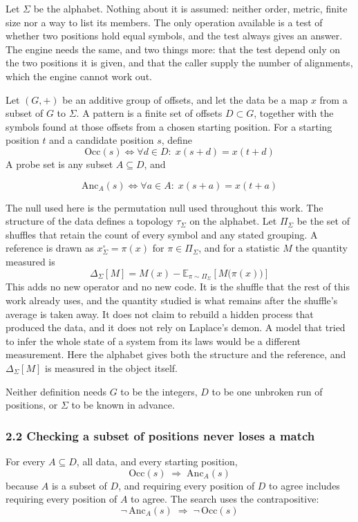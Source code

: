 Let \(\Sigma\) be the alphabet. Nothing about it is assumed: neither order, metric, finite size nor a way to list its members. The only operation available is a test of whether two positions hold equal symbols, and the test always gives an answer. The engine needs the same, and two things more: that the test depend only on the two positions it is given, and that the caller supply the number of alignments, which the engine cannot work out.

Let \((G,+)\) be an additive group of offsets, and let the data be a map \(x\) from a subset of \(G\) to \(\Sigma\). A pattern is a finite set of offsets \(D \subset G\), together with the symbols found at those offsets from a chosen starting position. For a starting position \(t\) and a candidate position \(s\), define
\[
  \mathrm{Occ}(s) \iff \forall d \in D:\; x(s+d) = x(t+d)
\]
A probe set is any subset \(A \subseteq D\), and

\[
  \mathrm{Anc}_A(s) \iff \forall a \in A:\; x(s+a) = x(t+a)
\]

The null used here is the permutation null used throughout this work. The structure of the data defines a topology \(\tau_\Sigma\) on the alphabet. Let \(\Pi_\Sigma\) be the set of shuffles that retain the count of every symbol and any stated grouping. A reference is drawn as \(x^\circ_\Sigma = \pi(x)\) for \(\pi \in \Pi_\Sigma\), and for a statistic \(M\) the quantity measured is
\[
  \Delta_\Sigma[M] = M(x) - \mathbb{E}_{\pi \sim \Pi_\Sigma}\!\left[M\bigl(\pi(x)\bigr)\right]
\]
This adds no new operator and no new code. It is the shuffle that the rest of this work already uses, and the quantity studied is what remains after the shuffle's average is taken away. It does not claim to rebuild a hidden process that produced the data, and it does not rely on Laplace's demon. A model that tried to infer the whole state of a system from its laws would be a different measurement. Here the alphabet gives both the structure and the reference, and \(\Delta_\Sigma[M]\) is measured in the object itself.

Neither definition needs \(G\) to be the integers, \(D\) to be one unbroken run of positions, or \(\Sigma\) to be known in advance.

\subsubsection{2.2 Checking a subset of positions never loses a match}

For every \(A \subseteq D\), all data, and every starting position,
\[
  \mathrm{Occ}(s) \;\Longrightarrow\; \mathrm{Anc}_A(s)
\]
because \(A\) is a subset of \(D\), and requiring every position of \(D\) to agree includes requiring every position of \(A\) to agree. The search uses the contrapositive:
\[
  \neg\,\mathrm{Anc}_A(s) \;\Longrightarrow\; \neg\,\mathrm{Occ}(s)
\]


